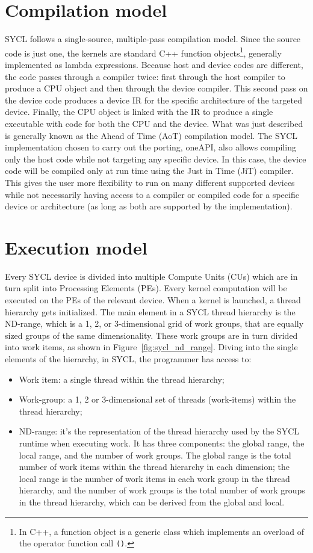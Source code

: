 \section{Compilation model}
\label{ch:compilation_model}
SYCL follows a single-source, multiple-pass compilation model. Since the source code is just one, the kernels are standard C++ function objects\footnote{In C++, a function object is a generic class which implements an overload of the operator function call \texttt{()}.}, generally implemented as lambda expressions. Because host and device codes are different, the code passes through a compiler twice: first through the host compiler to produce a CPU object and then through the device compiler. This second pass on the device code produces a device IR for the specific architecture of the targeted device. Finally, the CPU object is linked with the IR to produce a single executable with code for both the CPU and the device. What was just described is generally known as the Ahead of Time (AoT) compilation model. The SYCL implementation chosen to carry out the porting, oneAPI, also allows compiling only the host code while not targeting any specific device. In this case, the device code will be compiled only at run time using the Just in Time (JiT) compiler. This gives the user more flexibility to run on many different supported devices while not necessarily having access to a compiler or compiled code for a specific device or architecture (as long as both are supported by the implementation).

\section{Execution model}
\label{ch:execution_model}
Every SYCL device is divided into multiple Compute Units (CUs) which are in turn split into Processing Elements (PEs). Every kernel computation will be executed on the PEs of the relevant device. When a kernel is launched, a thread hierarchy gets initialized. The main element in a SYCL thread hierarchy is the ND-range, which is a 1, 2, or 3-dimensional grid of work groups, that are equally sized groups of the same dimensionality. These work groups are in turn divided into work items, as shown in Figure~\ref{fig:sycl_nd_range}. Diving into the single elements of the hierarchy, in SYCL, the programmer has access to:
\begin{itemize}
    \item Work item: a single thread within the thread hierarchy;
    \item Work-group: a 1, 2 or 3-dimensional set of threads (work-items) within the thread hierarchy;
    \item ND-range: it's the representation of the thread hierarchy used by the SYCL runtime when executing work. It has three components: the global range, the local range, and the number of work groups. The global range is the total number of work items within the thread hierarchy in each dimension; the local range is the number of work items in each work group in the thread hierarchy, and the number of work groups is the total number of work groups in the thread hierarchy, which can be derived from the global and local.
\end{itemize}

